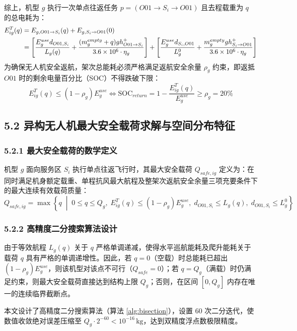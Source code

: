 \documentclass[withoutpreface,bwprint]{format}
\begin{document}
综上，机型 $g$ 执行一次单点往返任务 $p = (O01 \to S_i \to O01)$ 且去程载重为 $q$ 的总电耗为：
\begin{align}
E_{ig}^T(q) &= E_{g, O01 \to S_i}(q) + E_{g, S_i \to O01}(0) \notag \\
&= \left[ \frac{E_g^{use} d_{O01, S_i}}{L_g(q)} + \frac{(m_g^{empty} + q) g h_{O01 \to S_i}^+}{3.6 \times 10^6 \cdot \eta_g} \right] + \left[ \frac{E_g^{use} d_{S_i, O01}}{L_g^0} + \frac{m_g^{empty} g h_{S_i \to O01}^+}{3.6 \times 10^6 \cdot \eta_g} \right]
\end{align}
为确保无人机安全返航，架次总能耗必须严格满足返航安全余量 $\rho_g$ 约束，即返抵 $O01$ 时的剩余电量百分比（SOC）不得跌破下限：
\begin{equation}
E_{ig}^T(q) \le (1 - \rho_g) E_g^{use} \iff \text{SOC}_{return} = 1 - \frac{E_{ig}^T(q)}{E_g^{use}} \ge \rho_g = 20\%
\end{equation}

\subsection{5.2 异构无人机最大安全载荷求解与空间分布特征}

\subsubsection{5.2.1 最大安全载荷的数学定义}
机型 $g$ 面向服务区 $S_i$ 执行单点往返飞行时，其最大安全载荷 $Q_{safe, ig}$ 定义为：在同时满足机身额定载重、单程抗风最大航程及整架次返航安全余量三项充要条件下的最大连续有效载荷质量：
\begin{equation}
Q_{safe, ig} = \max \left\{ q \;\middle|\; 0 \le q \le Q_g, \; E_{ig}^T(q) \le (1 - \rho_g) E_g^{use}, \; d_{O01, S_i} \le L_g(q), \; d_{O01, S_i} \le L_g^0 \right\}
\end{equation}

\subsubsection{5.2.2 高精度二分搜索算法设计}
由于等效航程 $L_g(q)$ 关于 $q$ 严格单调递减，使得水平巡航能耗及爬升能耗关于载荷 $q$ 具有严格的单调递增性。因此，若 $q=0$（空载）时总能耗已超出 $(1-\rho_g)E_g^{use}$，则该机型对该点不可行（$Q_{safe}=0$）；若 $q=Q_g$（满载）时仍满足约束，则最大安全载荷直接达到结构上限 $Q_g$；否则，在区间 $[0, Q_g]$ 内存在唯一的连续临界截断点。

本文设计了高精度二分搜索算法（算法 \ref{alg:bisection}），设置 $60$ 次二分迭代，使数值收敛绝对误差压缩至 $Q_g \cdot 2^{-60} < 10^{-16}\,\text{kg}$，达到双精度浮点数极限精度。
\end{document}
